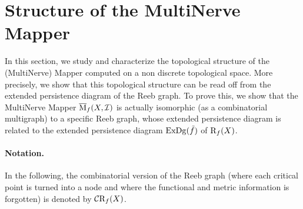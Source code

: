 \section{Structure of the MultiNerve Mapper}
\label{sec:structure}

In this section, we study and characterize the topological structure of the (MultiNerve) Mapper computed on a non discrete topological space.
More precisely, we show that this topological structure can be read off
from the extended persistence diagram of the Reeb graph. %
To prove this, we show that the MultiNerve Mapper $\overline{\mathrm{M}}_f(X,\mathcal{I})$ is actually isomorphic (as a combinatorial multigraph)
to a specific Reeb graph, %
whose extended persistence diagram is related to 
the extended persistence diagram $\mathrm{ExDg}(\tilde f)$ of $\mathrm{R}_f(X)$. 

\paragraph*{Notation.} In the following, the combinatorial version of the Reeb graph (where each critical point is 
turned into a node and where the functional and metric information is forgotten) is
denoted by $\mathcal{C}\mathrm{R}_f(X)$.

 

